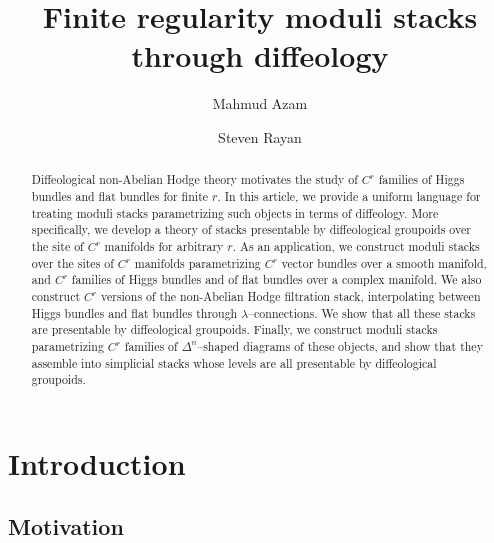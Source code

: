 \documentclass[11pt]{amsart}
\title{Finite regularity moduli stacks through diffeology}
\author{Mahmud Azam}
\author{Steven Rayan}
\begin{document}
\maketitle

\begin{abstract}
Diffeological non-Abelian Hodge theory motivates the study of $C^r$ families of 
Higgs bundles and flat bundles for finite $r$. In this article,
we provide a uniform language for treating moduli stacks parametrizing such objects
in terms of diffeology. More specifically, we develop a theory of stacks presentable by
diffeological groupoids over the site of $C^r$ manifolds for arbitrary $r$.
As an application, we construct moduli stacks over the
sites of $C^r$ manifolds parametrizing $C^r$ vector bundles over a smooth manifold, and $C^r$
families of Higgs bundles and of flat bundles over a complex manifold.
We also construct $C^r$ versions of the non-Abelian Hodge
filtration stack, interpolating between Higgs bundles and flat bundles through
$\lambda$--connections.
We show that all these stacks are presentable by diffeological groupoids.
Finally, we construct moduli stacks parametrizing $C^r$ families of
$\Delta^n$--shaped diagrams of
these objects, and show that they assemble into simplicial stacks whose levels are all
presentable by diffeological groupoids.
\end{abstract}

\tableofcontents

\section{Introduction}
\label{sec:introduction}

\subsection{Motivation}
\end{document}
